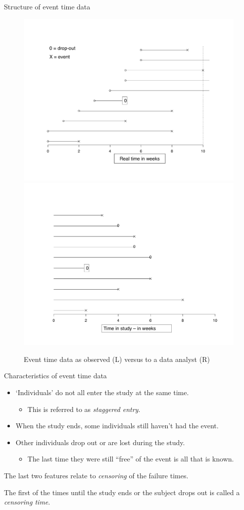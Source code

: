 \documentclass[ignorenonframetext,]{beamer}
\providecommand{\tightlist}{%
  \setlength{\itemsep}{0pt}\setlength{\parskip}{0pt}}
\begin{document}
\begin{frame}{%
\protect\hypertarget{structure-of-event-time-data}{%
Structure of event time data}}

\begin{figure}
\includegraphics[width=0.5\linewidth]{../figures/censoring_1} \includegraphics[width=0.5\linewidth]{../figures/censoring_2} \caption{Event time data as observed (L) versus to a data analyst (R)}\label{fig:unnamed-chunk-2}
\end{figure}

\end{frame}

\begin{frame}{%
\protect\hypertarget{characteristics-of-event-time-data}{%
Characteristics of event time data}}

\begin{itemize}
\tightlist
\item
  `Individuals’ do not all enter the study at the same time.

  \begin{itemize}
  \tightlist
  \item
    This is referred to as \emph{staggered entry}.
  \end{itemize}
\item
  When the study ends, some individuals still haven’t had the event.
\item
  Other individuals drop out or are lost during the study.

  \begin{itemize}
  \tightlist
  \item
    The last time they were still “free” of the event is all that is
    known.
  \end{itemize}
\end{itemize}

The last two features relate to \emph{censoring} of the failure times.

The first of the times until the study ends or the subject drops out is
called a \emph{censoring time}.

\end{frame}
\end{document}
